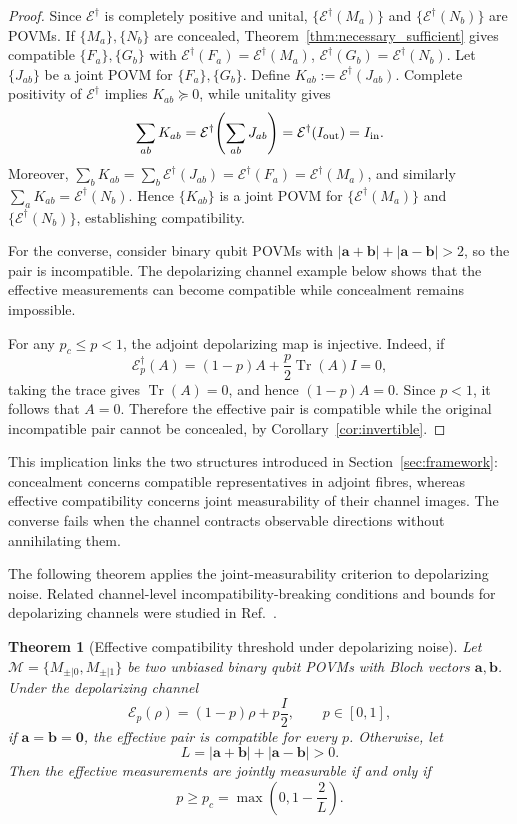 \documentclass[
aps,pra,twocolumn,10pt,
superscriptaddress,longbibliography,floatfix
]{revtex4-2}
\DeclareMathOperator{\Tr}{Tr}
\newtheorem{theorem}{Theorem}[section]
\begin{document}
\begin{proof}
Since $\mathcal{E}^\dagger$ is completely positive and unital, $\{\mathcal{E}^\dagger(M_a)\}$ and $\{\mathcal{E}^\dagger(N_b)\}$ are POVMs. If $\{M_a\},\{N_b\}$ are concealed, Theorem~\ref{thm:necessary_sufficient} gives compatible $\{F_a\},\{G_b\}$ with $\mathcal{E}^\dagger(F_a)=\mathcal{E}^\dagger(M_a)$, $\mathcal{E}^\dagger(G_b)=\mathcal{E}^\dagger(N_b)$. Let $\{J_{ab}\}$ be a joint POVM for $\{F_a\},\{G_b\}$. Define $K_{ab} := \mathcal{E}^\dagger(J_{ab})$. Complete positivity of $\mathcal{E}^\dagger$ implies $K_{ab} \succeq 0$, while unitality gives
\[
\sum_{ab} K_{ab} = \mathcal{E}^\dagger\!\left(\sum_{ab} J_{ab}\right) = \mathcal{E}^\dagger(I_{\rm out}) = I_{\rm in}.
\]
Moreover, $\sum_b K_{ab} = \sum_b \mathcal{E}^\dagger(J_{ab}) = \mathcal{E}^\dagger(F_a) = \mathcal{E}^\dagger(M_a)$, and similarly $\sum_a K_{ab} = \mathcal{E}^\dagger(N_b)$. Hence $\{K_{ab}\}$ is a joint POVM for $\{\mathcal{E}^\dagger(M_a)\}$ and $\{\mathcal{E}^\dagger(N_b)\}$, establishing compatibility.

For the converse, consider binary qubit POVMs with $|\mathbf{a}+\mathbf{b}| + |\mathbf{a}-\mathbf{b}| > 2$, so the pair is incompatible. The depolarizing channel example below shows that the effective measurements can become compatible while concealment remains impossible.

For any $p_c\le p<1$, the adjoint depolarizing map is injective. Indeed, if
\[
\mathcal E_p^\dagger(A)
=
(1-p)A+\frac p2\Tr(A)I
=
0,
\]
taking the trace gives $\Tr(A)=0$, and hence
$(1-p)A=0$. Since $p<1$, it follows that $A=0$.
Therefore the effective pair is compatible while the original
incompatible pair cannot be concealed, by
Corollary~\ref{cor:invertible}.
\end{proof}

This implication links the two structures introduced in Section~\ref{sec:framework}: concealment concerns compatible representatives in adjoint fibres, whereas effective compatibility concerns joint measurability of their channel images. The converse fails when the channel contracts observable directions without annihilating them.

The following theorem applies the joint-measurability criterion to depolarizing noise. Related channel-level incompatibility-breaking conditions and bounds for depolarizing channels were studied in Ref.~\cite{Heinosaari2015IB}.

\begin{theorem}[Effective compatibility threshold under depolarizing noise]
\label{thm:depol_threshold}
Let $\mathcal M=\{M_{\pm|0},M_{\pm|1}\}$ be two unbiased binary qubit POVMs with Bloch vectors $\mathbf a,\mathbf b$. Under the depolarizing channel
\[
\mathcal E_p(\rho)=(1-p)\rho+p\frac{I}{2},
\qquad p\in[0,1],
\]
if $\mathbf a=\mathbf b=\mathbf 0$, the effective pair is compatible for every $p$. Otherwise, let
\[
L=|\mathbf a+\mathbf b|+|\mathbf a-\mathbf b|>0.
\]
Then the effective measurements are jointly measurable if and only if
\[
p\ge p_c
=
\max\!\left(0,1-\frac{2}{L}\right).
\]
\end{theorem}
\end{document}
